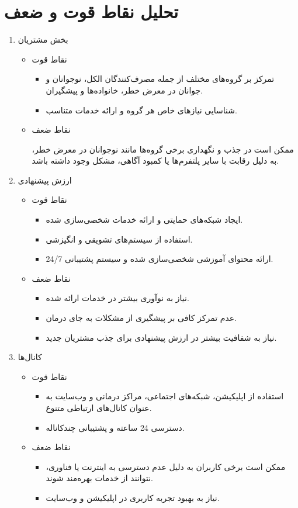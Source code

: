 \documentclass[dvipsnames, svgnames, x11names, 11pt]{article}
\begin{document}
\section{تحلیل نقاط قوت و ضعف}
\begin{enumerate}
\item 
بخش مشتریان 
\begin{itemize}
\item 
نقاط قوت
\begin{itemize}
\item 
تمرکز بر گروه‌های مختلف از جمله مصرف‌کنندگان الکل، نوجوانان و جوانان در معرض خطر، خانواده‌ها و پیشگیران.
\item 
شناسایی نیازهای خاص هر گروه و ارائه خدمات متناسب.
\end{itemize}

\item 
نقاط ضعف

ممکن است در جذب و نگهداری برخی گروه‌ها مانند نوجوانان در معرض خطر، به دلیل رقابت با سایر پلتفرم‌ها یا کمبود آگاهی، مشکل وجود داشته باشد.
\end{itemize}

\item    
ارزش پیشنهادی 
\begin{itemize}
\item 
نقاط قوت
\begin{itemize}
\item 
ایجاد شبکه‌های حمایتی و ارائه خدمات شخصی‌سازی شده.
\item 
استفاده از سیستم‌های تشویقی و انگیزشی.
\item 
ارائه محتوای آموزشی شخصی‌سازی شده و سیستم پشتیبانی 24/7.
\end{itemize}
\item 
نقاط ضعف
\begin{itemize}
\item 
نیاز به نوآوری بیشتر در خدمات ارائه شده.
\item 
عدم تمرکز کافی بر پیشگیری از مشکلات به جای درمان.
\item 
نیاز به شفافیت بیشتر در ارزش پیشنهادی برای جذب مشتریان جدید.
\end{itemize}
\end{itemize}
 
\item 
کانال‌ها 
\begin{itemize}
\item 
نقاط قوت
\begin{itemize}
\item 
استفاده از اپلیکیشن، شبکه‌های اجتماعی، مراکز درمانی و وب‌سایت به عنوان کانال‌های ارتباطی متنوع.
\item 
دسترسی 24 ساعته و پشتیبانی چندکاناله.
\end{itemize}
\item 
نقاط ضعف
\begin{itemize}
\item 
ممکن است برخی کاربران به دلیل عدم دسترسی به اینترنت یا فناوری، نتوانند از خدمات بهره‌مند شوند.
\item 
نیاز به بهبود تجربه کاربری در اپلیکیشن و وب‌سایت.
\end{itemize}
\end{itemize}


\end{enumerate}
\end{document}
